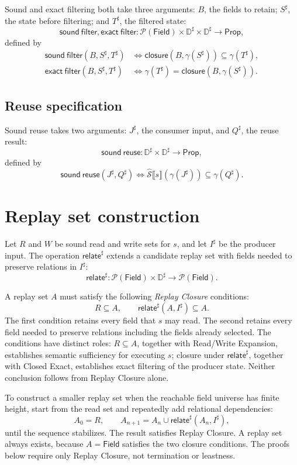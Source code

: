 \documentclass[10pt]{article}
\newcommand{\Field}{\mathsf{Field}}
\newcommand{\CollectingSemantics}[1]{\widehat{\mathcal S}\mathopen{⟦}#1\mathclose{⟧}}
\newcommand{\ProjClose}{\mathsf{closure}}
\newcommand{\relate}{\mathsf{relate}}
\newcommand{\SoundFilter}{\mathsf{sound\ filter}}
\newcommand{\ExactFilter}{\mathsf{exact\ filter}}
\newcommand{\SoundReuse}{\mathsf{sound\ reuse}}
\begin{document}
Sound and exact filtering both take three arguments: \(B\), the fields to retain;
\(S^\sharp\), the state before filtering; and \(T^\sharp\), the filtered state:
\[
  \SoundFilter,\ExactFilter:
  \mathcal P(\Field)\times\mathbb D^\sharp\times\mathbb D^\sharp
  \to\mathsf{Prop},
\]
defined by
\begin{align*}
  \SoundFilter(B,S^\sharp,T^\sharp)
  &\Longleftrightarrow
  \ProjClose\!\left(B,\gamma(S^\sharp)\right)\subseteq\gamma(T^\sharp),\\
  \ExactFilter(B,S^\sharp,T^\sharp)
  &\Longleftrightarrow
  \gamma(T^\sharp)=\ProjClose\!\left(B,\gamma(S^\sharp)\right).
\end{align*}
\subsection{Reuse specification}

Sound reuse takes two arguments: \(J^\sharp\), the consumer input, and \(Q^\sharp\), the
reuse result:
\[
  \SoundReuse:\mathbb D^\sharp\times\mathbb D^\sharp\to\mathsf{Prop},
\]
defined by
\[
  \SoundReuse(J^\sharp,Q^\sharp)
  \Longleftrightarrow
  \CollectingSemantics{s}\!\left(\gamma(J^\sharp)\right)
  \subseteq\gamma(Q^\sharp).
  \tag{SR}
\]

\section{Replay set construction}

Let \(R\) and \(W\) be sound read and write sets for \(s\), and let \(I^\sharp\) be the
producer input. The operation \(\relate^\sharp\) extends a candidate replay set with fields
needed to preserve relations in \(I^\sharp\):
\[
  \relate^\sharp:
  \mathcal P(\Field)\times\mathbb D^\sharp\to\mathcal P(\Field).
\]

A replay set \(A\) must satisfy the following \emph{Replay Closure} conditions:
\[
  R\subseteq A,
  \qquad
  \relate^\sharp(A,I^\sharp)\subseteq A.
  \tag{Replay Closure}
\]
The first condition retains every field that \(s\) may read. The second retains every field
needed to preserve relations including the fields already selected. The conditions have distinct
roles: \(R\subseteq A\), together with Read/Write Expansion, establishes semantic sufficiency for
executing \(s\); closure under \(\relate^\sharp\), together with Closed Exact, establishes exact
filtering of the producer state. Neither conclusion follows from Replay Closure alone.

To construct a smaller replay set when the reachable field universe has finite height, start from
the read set and repeatedly add relational dependencies:
\[
  A_0=R,
  \qquad
  A_{n+1}=A_n\cup\relate^\sharp(A_n,I^\sharp),
\]
until the sequence stabilizes. The result satisfies Replay Closure. A replay set always exists,
because \(A=\Field\) satisfies the two closure conditions. The proofs below require only
Replay Closure, not termination or leastness.
\end{document}
